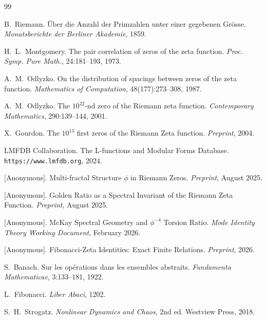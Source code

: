 \documentclass[11pt,a4paper]{article}
\begin{document}
\newpage

\begin{thebibliography}{99}

B.~Riemann.
\newblock \"Uber die Anzahl der Primzahlen unter einer gegebenen Gr\"osse.
\newblock \emph{Monatsberichte der Berliner Akademie}, 1859.

H.~L.~Montgomery.
\newblock The pair correlation of zeros of the zeta function.
\newblock \emph{Proc. Symp. Pure Math.}, 24:181--193, 1973.

A.~M.~Odlyzko.
\newblock On the distribution of spacings between zeros of the zeta function.
\newblock \emph{Mathematics of Computation}, 48(177):273--308, 1987.

A.~M.~Odlyzko.
\newblock The $10^{22}$-nd zero of the Riemann zeta function.
\newblock \emph{Contemporary Mathematics}, 290:139--144, 2001.

X.~Gourdon.
\newblock The $10^{13}$ first zeros of the Riemann Zeta function.
\newblock \emph{Preprint}, 2004.

LMFDB Collaboration.
\newblock The L-functions and Modular Forms Database.
\newblock \texttt{https://www.lmfdb.org}, 2024.

[Anonymous].
\newblock Multi-fractal Structure $\phi$ in Riemann Zeros.
\newblock \emph{Preprint}, August 2025.

[Anonymous].
\newblock Golden Ratio as a Spectral Invariant of the Riemann Zeta Function.
\newblock \emph{Preprint}, August 2025.

[Anonymous].
\newblock McKay Spectral Geometry and $\phi^{-4}$ Torsion Ratio.
\newblock \emph{Mode Identity Theory Working Document}, February 2026.

[Anonymous].
\newblock Fibonacci-Zeta Identities: Exact Finite Relations.
\newblock \emph{Preprint}, 2026.

S.~Banach.
\newblock Sur les op\'erations dans les ensembles abstraits.
\newblock \emph{Fundamenta Mathematicae}, 3:133--181, 1922.

L.~Fibonacci.
\newblock \emph{Liber Abaci}, 1202.

S.~H.~Strogatz.
\newblock \emph{Nonlinear Dynamics and Chaos}, 2nd ed.
\newblock Westview Press, 2018.


\end{thebibliography}
\end{document}
